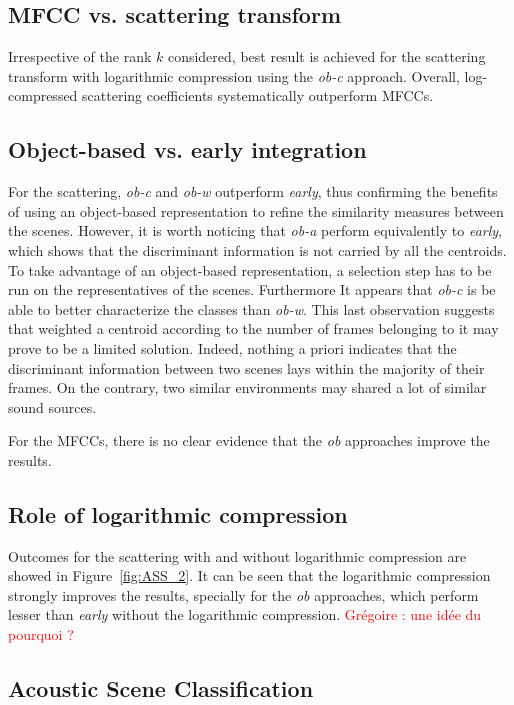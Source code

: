 \documentclass[journal]{IEEEtran}
\makeatletter
\newcommand*{\vs}{vs.\@\xspace}
\newcommand{\gl}[1]{\textcolor{red}{Gr\'egoire : #1}}
\makeatother
\begin{document}
\subsection*{MFCC \vs scattering transform}

Irrespective of the rank $k$ considered, best result is achieved for the scattering transform with logarithmic compression using the \emph{ob-c} approach. Overall, log-compressed scattering coefficients systematically outperform MFCCs.

\subsection*{Object-based \vs early integration}

For the scattering, \emph{ob-c} and \emph{ob-w} outperform \emph{early}, thus confirming the benefits of using an object-based representation to refine the similarity measures between the scenes. However, it is worth noticing that \emph{ob-a} perform equivalently to \emph{early}, which shows that the discriminant information is not carried by all the centroids. To take advantage of an object-based representation, a selection step has to be run on the representatives of the scenes. Furthermore It appears that \emph{ob-c} is be able to better characterize the classes than \emph{ob-w}. This last observation suggests that weighted a centroid according to the number of frames belonging to it may prove to be a limited solution. Indeed, nothing a priori indicates that the discriminant information between two scenes lays within the majority of their frames. On the contrary, two similar environments may shared a lot of similar sound sources.

For the MFCCs, there is no clear evidence that the \emph{ob} approaches improve the results.

\subsection*{Role of logarithmic compression}

Outcomes for the scattering with and without logarithmic compression are showed in Figure~\ref{fig:ASS_2}. It can be seen that the logarithmic compression strongly improves the results, specially for the \emph{ob} approaches, which perform lesser than \emph{early} without the logarithmic compression. \gl{une idée du pourquoi ?}

\subsection{Acoustic Scene Classification}
\end{document}
